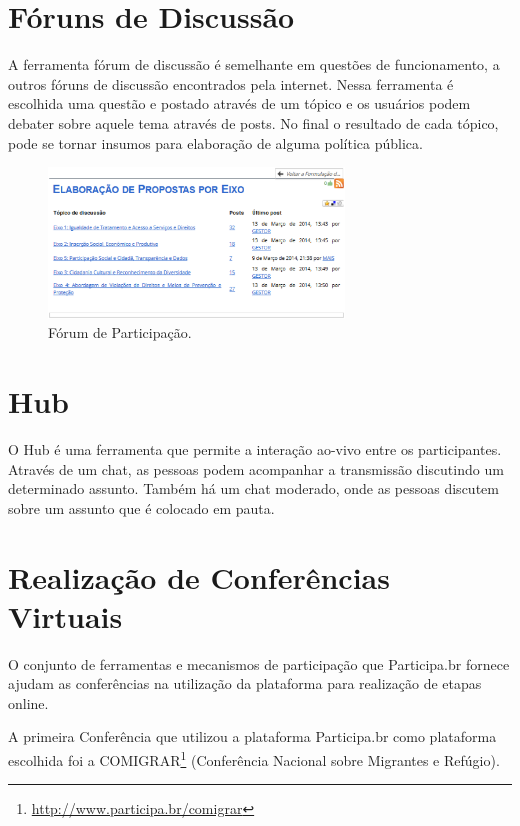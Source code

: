 \section*{Fóruns de Discussão}

A ferramenta fórum de discussão é semelhante em questões de funcionamento, a outros fóruns de discussão encontrados pela internet. Nessa ferramenta é escolhida uma questão e postado através de um tópico e os usuários podem debater sobre aquele tema através de posts. No final o resultado de cada tópico, pode se tornar insumos para elaboração de alguma política pública.

\graphicspath{{figuras/}}
\begin{figure}[H]
\centering
\includegraphics[width=0.7\textwidth]{foruns-participacao}
\caption{Fórum de Participação.}
\label{fig:forumsparticipacao}
\end{figure}

\section*{Hub}

O Hub é uma ferramenta que permite a interação ao-vivo entre os participantes. Através de um chat, as pessoas podem acompanhar a transmissão discutindo um determinado assunto. Também há um chat moderado, onde as pessoas discutem sobre um assunto que é colocado em pauta. 

\section*{Realização de Conferências Virtuais}

O conjunto de ferramentas e mecanismos de participação que Participa.br fornece ajudam as conferências na utilização da plataforma para realização de etapas online.

A primeira Conferência que utilizou a plataforma Participa.br como plataforma escolhida foi a COMIGRAR\footnote{\url{http://www.participa.br/comigrar}} (Conferência Nacional sobre Migrantes e Refúgio).

